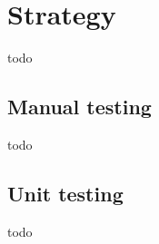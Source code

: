 \section{Strategy}
\label{sec:Strategy}

todo

\subsection{Manual testing}
todo

\subsection{Unit testing}
todo